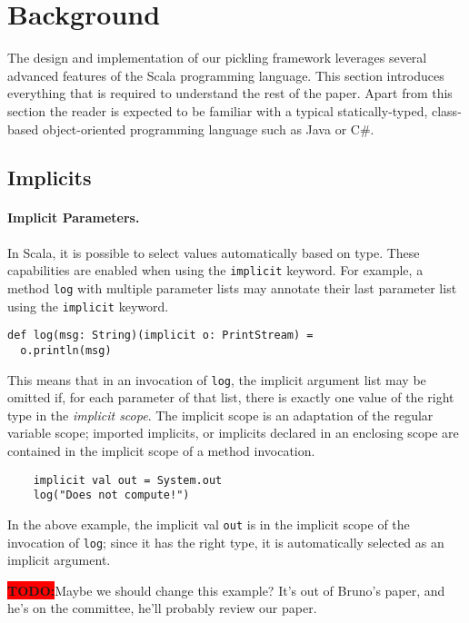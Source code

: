 \documentclass[preprint,10pt]{sigplanconf}
\theoremstyle{definition}
\newcommand{\todo}{{\bf \colorbox{red}{\color{white}TODO:}}}
\newcommand{\term}[1]{\mbox{\texttt{#1}}}
\begin{document}
\section{Background}
\label{sec:background}

The design and implementation of our pickling framework leverages
several advanced features of the Scala programming language. This
section introduces everything that is required to understand the rest
of the paper. Apart from this section the reader is expected to be
familiar with a typical statically-typed, class-based object-oriented
programming language such as Java or C\#.

\subsection{Implicits}
\label{sec:implicits}

\paragraph{Implicit Parameters.} In Scala, it is possible to select values
automatically based on type. These capabilities are enabled when using the
\term{implicit} keyword. For example, a method \term{log} with multiple
parameter lists may annotate their last parameter list using the
\term{implicit} keyword.

\begin{lstlisting}
def log(msg: String)(implicit o: PrintStream) =
  o.println(msg)
\end{lstlisting}

This means that in an invocation of \term{log}, the implicit argument list may
be omitted if, for each parameter of that list, there is exactly one value of
the right type in the {\em implicit scope}. The implicit scope is an
adaptation of the regular variable scope; imported implicits, or implicits
declared in an enclosing scope are contained in the implicit scope of a method
invocation.

\begin{lstlisting}
    implicit val out = System.out
    log("Does not compute!")
\end{lstlisting}

In the above example, the implicit val \term{out} is in the implicit scope of
the invocation of \term{log}; since it has the right type, it is automatically
selected as an implicit argument.

\todo Maybe we should change this example? It's out of Bruno's paper, and he's
on the committee, he'll probably review our paper.
\end{document}
